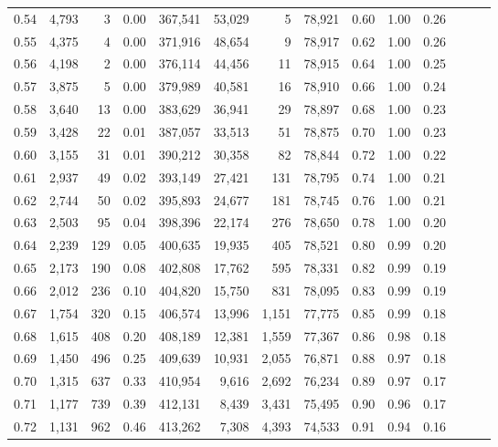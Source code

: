 \begin{tabular}{rrrrrrrrrrrrrr}
0.54 &  4,793 &      3 &  0.00 &  367,541 &   53,029 &       5 &  78,921 &  0.60 &  1.00 &      0.26 \\
0.55 &  4,375 &      4 &  0.00 &  371,916 &   48,654 &       9 &  78,917 &  0.62 &  1.00 &      0.26 \\
0.56 &  4,198 &      2 &  0.00 &  376,114 &   44,456 &      11 &  78,915 &  0.64 &  1.00 &      0.25 \\
0.57 &  3,875 &      5 &  0.00 &  379,989 &   40,581 &      16 &  78,910 &  0.66 &  1.00 &      0.24 \\
0.58 &  3,640 &     13 &  0.00 &  383,629 &   36,941 &      29 &  78,897 &  0.68 &  1.00 &      0.23 \\
0.59 &  3,428 &     22 &  0.01 &  387,057 &   33,513 &      51 &  78,875 &  0.70 &  1.00 &      0.23 \\
0.60 &  3,155 &     31 &  0.01 &  390,212 &   30,358 &      82 &  78,844 &  0.72 &  1.00 &      0.22 \\
0.61 &  2,937 &     49 &  0.02 &  393,149 &   27,421 &     131 &  78,795 &  0.74 &  1.00 &      0.21 \\
0.62 &  2,744 &     50 &  0.02 &  395,893 &   24,677 &     181 &  78,745 &  0.76 &  1.00 &      0.21 \\
0.63 &  2,503 &     95 &  0.04 &  398,396 &   22,174 &     276 &  78,650 &  0.78 &  1.00 &      0.20 \\
0.64 &  2,239 &    129 &  0.05 &  400,635 &   19,935 &     405 &  78,521 &  0.80 &  0.99 &      0.20 \\
0.65 &  2,173 &    190 &  0.08 &  402,808 &   17,762 &     595 &  78,331 &  0.82 &  0.99 &      0.19 \\
0.66 &  2,012 &    236 &  0.10 &  404,820 &   15,750 &     831 &  78,095 &  0.83 &  0.99 &      0.19 \\
0.67 &  1,754 &    320 &  0.15 &  406,574 &   13,996 &   1,151 &  77,775 &  0.85 &  0.99 &      0.18 \\
0.68 &  1,615 &    408 &  0.20 &  408,189 &   12,381 &   1,559 &  77,367 &  0.86 &  0.98 &      0.18 \\
0.69 &  1,450 &    496 &  0.25 &  409,639 &   10,931 &   2,055 &  76,871 &  0.88 &  0.97 &      0.18 \\
0.70 &  1,315 &    637 &  0.33 &  410,954 &    9,616 &   2,692 &  76,234 &  0.89 &  0.97 &      0.17 \\
0.71 &  1,177 &    739 &  0.39 &  412,131 &    8,439 &   3,431 &  75,495 &  0.90 &  0.96 &      0.17 \\
0.72 &  1,131 &    962 &  0.46 &  413,262 &    7,308 &   4,393 &  74,533 &  0.91 &  0.94 &      0.16 \\

\end{tabular}
